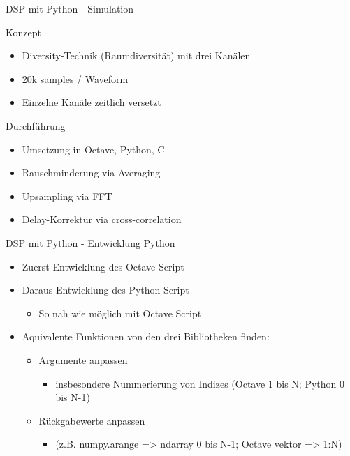 \documentclass[8pt]{beamer}
\begin{document}
\begin{frame}[label={sec:org8b5e5af}]{DSP mit Python - Simulation}
\begin{block}{Konzept}
\begin{itemize}
\item Diversity-Technik (Raumdiversität) mit drei Kanälen
\item 20k samples / Waveform
\item Einzelne Kanäle zeitlich versetzt
\end{itemize}
\end{block}

\begin{block}{Durchführung}
\begin{itemize}
\item Umsetzung in Octave, Python, C
\item Rauschminderung via Averaging
\item Upsampling via FFT
\item Delay-Korrektur via cross-correlation
\end{itemize}
\end{block}
\end{frame}


\begin{frame}[label={sec:org6bf0059}]{DSP mit Python - Entwicklung Python}
\begin{itemize}
\item Zuerst Entwicklung des Octave Script
\item Daraus Entwicklung des Python Script 
\begin{itemize}
\item So nah wie möglich mit Octave Script
\end{itemize}
\item Aquivalente Funktionen von den drei Bibliotheken finden:
\begin{itemize}
\item Argumente anpassen 
\begin{itemize}
\item insbesondere Nummerierung von Indizes (Octave 1 bis N; Python 0 bis N-1)
\end{itemize}
\item Rückgabewerte anpassen 
\begin{itemize}
\item (z.B. numpy.arange => ndarray 0 bis N-1; Octave vektor => 1:N)
\end{itemize}
\end{itemize}
\end{itemize}
\end{frame}
\end{document}
